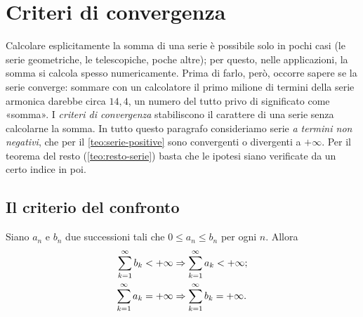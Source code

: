 \section{Criteri di convergenza}
\label{sec:criteri-convergenza}

Calcolare esplicitamente la somma di una serie è possibile solo in pochi casi (le
serie geometriche, le telescopiche, poche altre); per questo, nelle applicazioni, la somma
si calcola spesso numericamente. Prima di farlo, però, occorre sapere se la serie
converge: sommare con un calcolatore il primo milione di termini della serie armonica
darebbe circa $14{,}4$, un numero del tutto privo di significato come «somma». I \emph{criteri di
convergenza} stabiliscono il carattere di una serie senza calcolarne la somma. In tutto
questo paragrafo consideriamo serie \emph{a termini non negativi}, che per il
\cref{teo:serie-positive} sono convergenti o divergenti a $+\infty$. Per il teorema del resto
(\cref{teo:resto-serie}) basta che le ipotesi siano verificate da un certo indice in poi.

\subsection{Il criterio del confronto}

\begin{teorema}\label{teo:confronto-serie}
Siano $a_{n}$ e $b_{n}$ due successioni tali che $0\le a_{n}\le b_{n}$ per ogni $n$. Allora
\begin{align}
  \sum_{k=1}^{\infty}b_{k}<+\infty &\Rightarrow \sum_{k=1}^{\infty}a_{k}<+\infty ; \label{eq:confronto-conv}\\
  \sum_{k=1}^{\infty}a_{k}=+\infty &\Rightarrow \sum_{k=1}^{\infty}b_{k}=+\infty . \label{eq:confronto-div}
\end{align}
\end{teorema}

\begin{schema}
\end{schema}

